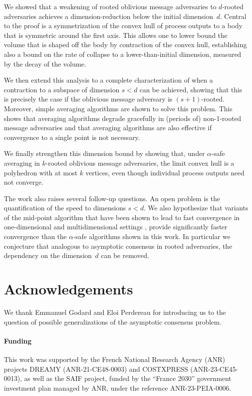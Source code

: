 \documentclass[preprint,12pt,a4paper]{elsarticle}
\theoremstyle{plain}
\theoremstyle{definition}
\begin{document}
We showed that a weakening of rooted oblivious message adversaries to
$d$-rooted adversaries achieves a dimension-reduction below the initial dimension~$d$.
Central to the proof is a symmetrization of the convex hull of process outputs to a body that is symmetric around the first axis.
This allows one to lower bound the volume that is shaped off the body by contraction of the convex hull, establishing also a bound
on the rate of collapse to a lower-than-initial dimension, measured by the decay of the volume.

We then extend this analysis to a complete characterization of when a contraction to a subspace of dimension $s < d$ can be achieved, showing that this is precisely the case if the oblivious message adversary is $(s+1)$-rooted.
Moreover, simple averaging algorithms are shown to solve this problem.
This shows that averaging algorithms degrade gracefully in (periods of) non-1-rooted message adversaries and that averaging algorithms are
also effective if convergence to a single point is not necessary.

We finally strengthen this dimension bound by showing that, under $\alpha$-safe
  averaging in $k$-rooted oblivious message adversaries, the limit convex hull is
  a polyhedron with at most $k$ vertices, even though individual process outputs
  need not converge.

The work also raises several follow-up questions.
An open problem is the quantification of the speed to dimensions $s < d$.
We also hypothesize that variants of the mid-point algorithm that have been shown to lead to fast convergence in one-dimensional \cite{CBFN16:icalp} and multidimensional settings \cite{CBFN16:centroid,FN18:disc}, provide significantly faster convergence than the $\alpha$-safe algorithms shown in this work.
In particular we conjecture that analogous to asymptotic consensus in rooted adversaries, the dependency on the dimension~$d$ can be removed.


\section*{Acknowledgements}
We thank Emmanuel Godard and Eloi Perdereau for introducing us to the question of possible generalizations of the asymptotic consensus problem.

\paragraph*{Funding}
This work was supported by the French National Research Agency
(ANR) projects DREAMY (\mbox{ANR-21-CE48-0003}) and COSTXPRESS (\mbox{ANR-23-CE45-0013}), as well as the SAIF project, funded by the ``France 2030'' government investment plan managed by ANR, under the reference \mbox{ANR-23-PEIA-0006}.
\end{document}
